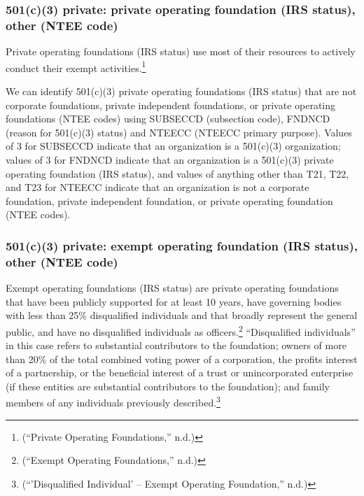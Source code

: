 \documentclass[
  letterpaper,
  DIV=11,
  numbers=noendperiod,
  oneside]{scrreprt}
\begin{document}
\hypertarget{c3-private-private-operating-foundation-irs-status-other-ntee-code}{%
\subsubsection{501(c)(3) private: private operating foundation (IRS
status), other (NTEE
code)}\label{c3-private-private-operating-foundation-irs-status-other-ntee-code}}

Private operating foundations (IRS status) use most of their resources
to actively conduct their exempt activities.\footnote{({``Private
  Operating Foundations,''} n.d.)}

We can identify 501(c)(3) private operating foundations (IRS status)
that are not corporate foundations, private independent foundations, or
private operating foundations (NTEE codes) using SUBSECCD (subsection
code), FNDNCD (reason for 501(c)(3) status) and NTEECC (NTEECC primary
purpose). Values of 3 for SUBSECCD indicate that an organization is a
501(c)(3) organization; values of 3 for FNDNCD indicate that an
organization is a 501(c)(3) private operating foundation (IRS status),
and values of anything other than T21, T22, and T23 for NTEECC indicate
that an organization is not a corporate foundation, private independent
foundation, or private operating foundation (NTEE codes).

\hypertarget{c3-private-exempt-operating-foundation-irs-status-other-ntee-code}{%
\subsubsection{501(c)(3) private: exempt operating foundation (IRS
status), other (NTEE
code)}\label{c3-private-exempt-operating-foundation-irs-status-other-ntee-code}}

Exempt operating foundations (IRS status) are private operating
foundations that have been publicly supported for at least 10 years,
have governing bodies with less than 25\% disqualified individuals and
that broadly represent the general public, and have no disqualified
individuals as officers.\footnote{({``Exempt Operating Foundations,''}
  n.d.)} ``Disqualified individuals'' in this case refers to substantial
contributors to the foundation; owners of more than 20\% of the total
combined voting power of a corporation, the profits interest of a
partnership, or the beneficial interest of a trust or unincorporated
enterprise (if these entities are substantial contributors to the
foundation); and family members of any individuals previously
described.\footnote{({``'Disqualified Individual' -- Exempt Operating
  Foundation,''} n.d.)}
\end{document}
